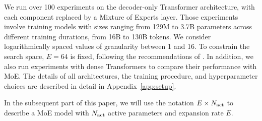 

We run over 100 experiments on the decoder-only Transformer architecture, with each \ff{} component replaced by a Mixture of Experts layer. Those experiments involve training models with sizes ranging from 129M to 3.7B parameters across different training durations, from 16B to 130B tokens. We consider logarithmically spaced values of granularity between 1 and 16. To constrain the search space, $E=64$ is fixed, following the recommendations of \cite{clark2022unified}.  In addition, we also run experiments with dense Transformers to compare their performance with MoE. The details of all architectures, the training procedure, and hyperparameter choices are described in detail in Appendix~\ref{app:setup}.

In the subsequent part of this paper, we will use the notation $E\times N_\text{act}$ to describe a MoE model with $N_\text{act}$ active parameters and expansion rate $E.$


